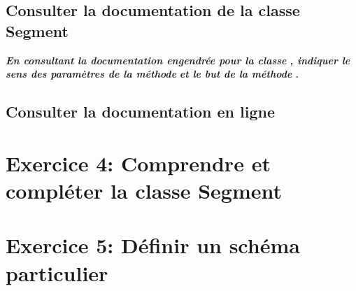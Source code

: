 \documentclass{sebaClass}
\newcommand{\q}[1]{\textit{\textbf{#1}}\\}
\newcommand{\ql}[1]{\textit{\textbf{#1}}}
\begin{document}
\subsection{Consulter la documentation de la classe Segment}
\ql{En consultant la documentation engendrée pour la classe} \ql{, indiquer le sens des paramètres de la méthode}  \ql{et le but de
   la méthode }\q{.}

\subsection{Consulter la documentation en ligne}
\section{Exercice 4: Comprendre et compléter la classe Segment}
\section{Exercice 5: Définir un schéma particulier}
\end{document}
